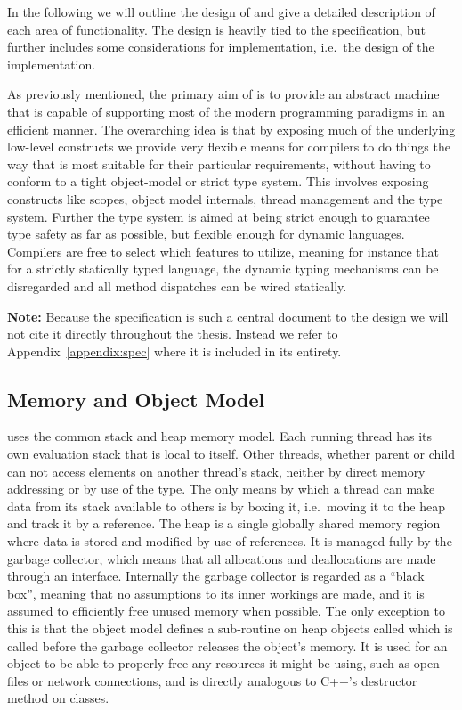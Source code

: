 In the following we will outline the design of \thename{} and give a detailed
description of each area of functionality. The design is heavily tied to the
\thename{} specification, but further includes some considerations for
implementation, i.e.~the design of the implementation.

As previously mentioned, the primary aim of \thename{} is to provide an abstract
machine that is capable of supporting most of the modern programming paradigms
in an efficient manner. The overarching idea is that by exposing much of the
underlying low-level constructs we provide very flexible means for compilers to
do things the way that is most suitable for their particular requirements,
without having to conform to a tight object-model or strict type system. This
involves exposing constructs like scopes, object model internals, thread
management and the type system. Further the type system is aimed at being strict
enough to guarantee type safety as far as possible, but flexible enough for
dynamic languages. Compilers are free to select which features to utilize,
meaning for instance that for a strictly statically typed language, the dynamic
typing mechanisms can be disregarded and all method dispatches can be wired
statically.

\textbf{Note:} Because the specification is such a central document to the
design we will not cite it directly throughout the thesis. Instead we refer to
Appendix~\ref{appendix:spec} where it is included in its entirety.

\subsection{Memory and Object Model}

\thename{} uses the common stack and heap memory model. Each running thread has
its own evaluation stack that is local to itself. Other threads, whether parent
or child can not access elements on another thread's stack, neither by direct
memory addressing or by use of the  type. The only means by
which a thread can make data from its stack available to others is by boxing it,
i.e.~moving it to the heap and track it by a reference. The heap is a single
globally shared memory region where data is stored and modified by use of
references. It is managed fully by the garbage collector, which means that all
allocations and deallocations are made through an interface. Internally the
garbage collector is regarded as a ``black box'', meaning that no assumptions to
its inner workings are made, and it is assumed to efficiently free unused memory
when possible. The only exception to this is that the object model defines a
sub-routine on heap objects called  which is called before the
garbage collector releases the object's memory. It is used for an object to be
able to properly free any resources it might be using, such as open files or
network connections, and is directly analogous to C++'s destructor method on
classes.

